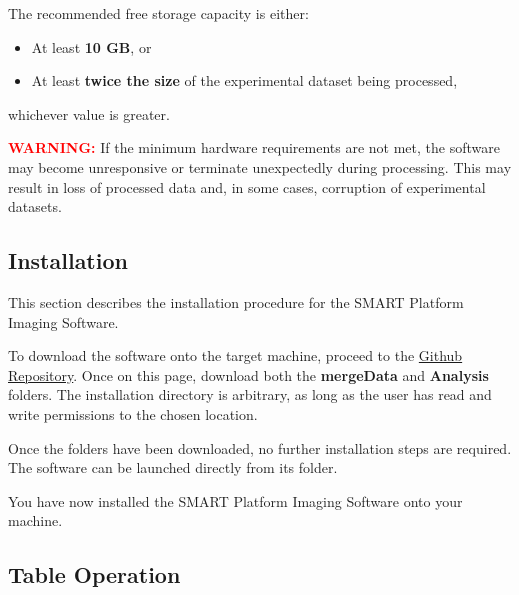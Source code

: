 \documentclass[12pt,a4paper,oneside]{report}
\begin{document}
The recommended free storage capacity is either:

\begin{itemize}
	\item At least \textbf{10 GB}, or
	\item At least \textbf{twice the size} of the experimental dataset being processed,
\end{itemize}

whichever value is greater.

\vspace{0.5cm}

\noindent
\textcolor{red}{\textbf{WARNING:}}
If the minimum hardware requirements are not met, the software may become unresponsive or terminate unexpectedly during processing. This may result in loss of processed data and, in some cases, corruption of experimental datasets.

\subsection{Installation}

This section describes the installation procedure for the SMART Platform Imaging Software.

\vspace{1cm}

To download the software onto the target machine, proceed to the \href{https://github.com/mcostagliola-IALR/SMARTPlatformSoftware}{Github Repository}. Once on this page, download both the \textbf{mergeData} and \textbf{Analysis} folders. The installation directory is arbitrary, as long as the user has read and write permissions to the chosen location.

\vspace{0.5cm}

\noindent Once the folders have been downloaded, no further installation steps are required. The software can be launched directly from its folder.

\vspace{0.5cm}

\noindent You have now installed the SMART Platform Imaging Software onto your machine.

\subsection{Table Operation}
\end{document}
